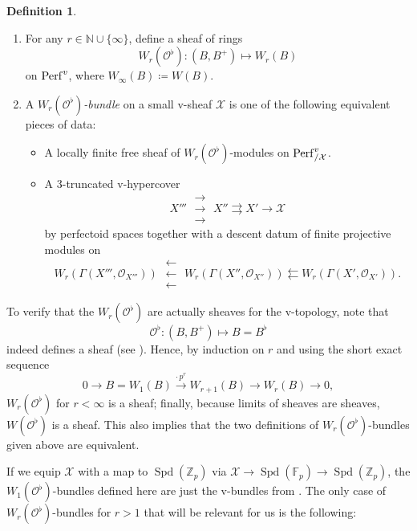 \documentclass[10pt,twoside]{article}
\numberwithin{equation}{section}
\theoremstyle{plain}
\theoremstyle{definition}
\newtheorem{mydef}[mythm]{Definition}
\DeclareMathOperator{\Spd}{Spd}
\DeclareMathOperator{\Perf}{Perf}
\newcommand{\ZZ}{\mathbb{Z}}
\newcommand{\NN}{\mathbb{N}}
\newcommand{\FF}{\mathbb{F}}
\newcommand{\MCO}{\mathcal{O}}
\newcommand{\MCX}{\mathcal{X}}
\newcommand{\rrrarrows}{\;\substack{\rightarrow\\[-1em] \rightarrow \\[-1em] \rightarrow}\;}
\begin{document}
\begin{mydef}\label{WBundleDef}
    \begin{enumerate}
        \item For any \(r\in \NN\cup \{\infty\}\), define a sheaf of rings
        \[W_r(\MCO^\flat)\colon (B,B^+)\longmapsto W_r(B)\]
        on \(\Perf^{\emph v}\), where \(W_\infty(B)\coloneqq W(B)\).
        \item  A \emph{\(W_r(\MCO^\flat)\)-bundle} on a small v-sheaf \(\MCX\) is one of the following equivalent pieces of data:
        \begin{itemize}
            \item A locally finite free sheaf of \(W_r(\MCO^\flat)\)-modules on \(\Perf^\emph{v}_{/\MCX}\).
            \item A 3-truncated v-hypercover
            \[X''' \rrrarrows X''\rightrightarrows X'\longrightarrow \MCX\]
            by perfectoid spaces together with a descent datum of finite projective modules on 
            \[W_r(\Gamma(X''',\MCO_{X'''}))\;\substack{\leftarrow\\[-1em] \leftarrow \\[-1em] \leftarrow}\; 
            W_r(\Gamma(X'',\MCO_{X''}))\leftleftarrows W_r(\Gamma(X',\MCO_{X'})).\]
        \end{itemize}
        
        
    \end{enumerate}
\end{mydef}

To verify that the \(W_r(\MCO^\flat)\) are actually sheaves for the v-topology, note that 
\[\MCO^\flat\colon(B,B^+)\mapsto B=B^\flat\]
indeed defines a sheaf (see ). Hence, by induction on \(r\) and using the short exact sequence
\[0\longrightarrow B=W_1(B)\xrightarrow{\cdot\, p^r} W_{r+1}(B)\longrightarrow W_{r}(B)\longrightarrow 0,\]
\(W_r(\MCO^\flat)\) for \(r<\infty\) is a sheaf; finally, because limits of sheaves are sheaves, \(W(\MCO^\flat)\) is a sheaf. This also implies that the two definitions of \(W_r(\MCO^\flat)\)-bundles given above are equivalent.

If we equip \(\MCX\) with a map to \(\Spd(\ZZ_p)\) via \(\MCX \to \Spd(\FF_p)\to \Spd(\ZZ_p)\), the \(W_1(\MCO^\flat)\)-bundles defined here are just the v-bundles from . The only case of \(W_r(\MCO^\flat)\)-bundles for \(r>1\) that will be relevant for us is the following:
\end{document}

